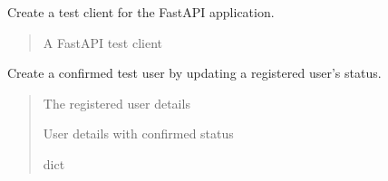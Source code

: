 \documentclass[letterpaper,10pt,openany,oneside,english]{sphinxmanual}
\begin{document}
\begin{savenotes}\begin{fulllineitems}
\label{\detokenize{modules/tests:storeapi.tests.conftest.client_fixture}}
\pysigstartsignatures
{}
\pysigstopsignatures
\sphinxAtStartPar
Create a test client for the FastAPI application.
\begin{quote}\begin{description}
\sphinxAtStartPar
{} \textendash{} A FastAPI test client

\end{description}\end{quote}

\end{fulllineitems}\end{savenotes}


\begin{savenotes}\begin{fulllineitems}
\label{\detokenize{modules/tests:storeapi.tests.conftest.confirmed_user_fixture}}
\pysigstartsignatures
{}
\pysigstopsignatures
\sphinxAtStartPar
Create a confirmed test user by updating a registered user’s status.
\begin{quote}\begin{description}
\sphinxAtStartPar
{} \textendash{} The registered user details

\sphinxAtStartPar
User details with confirmed status

\sphinxAtStartPar
dict

\end{description}\end{quote}

\end{fulllineitems}\end{savenotes}
\end{document}
